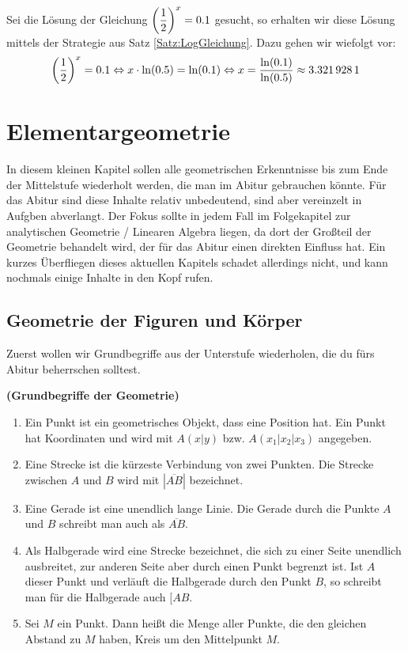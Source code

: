 \documentclass[ngerman, 12pt]{nssheetxea}
\begin{document}
\begin{example}
Sei die Lösung der Gleichung $\mleft(\dfrac{1}{2}\mright)^x = \num{0,1}$ gesucht, so erhalten wir diese Lösung mittels der Strategie aus Satz \ref{Satz:LogGleichung}. Dazu gehen wir wiefolgt vor:
\[ \mleft(\dfrac{1}{2}\mright)^x = \num{0,1} \Leftrightarrow x \cdot \ln (\num{0,5}) = \ln(\num{0,1}) \Leftrightarrow x = \dfrac{\ln(\num{0,1})}{\ln (\num{0,5})} \approx \num{3,3219281} \]
\end{example}

\newpage
\section{Elementargeometrie}
In diesem kleinen Kapitel sollen alle geometrischen Erkenntnisse bis zum Ende der Mittelstufe wiederholt werden, die man im Abitur gebrauchen könnte. Für das Abitur sind diese Inhalte relativ unbedeutend, sind aber vereinzelt in Aufgben abverlangt. Der Fokus sollte in jedem Fall im Folgekapitel zur analytischen Geometrie / Linearen Algebra liegen, da dort der Großteil der Geometrie behandelt wird, der für das Abitur einen direkten Einfluss hat. Ein kurzes Überfliegen dieses aktuellen Kapitels schadet allerdings nicht, und kann nochmals einige Inhalte in den Kopf rufen.

\subsection{Geometrie der Figuren und Körper}

Zuerst wollen wir Grundbegriffe aus der Unterstufe wiederholen, die du fürs Abitur beherrschen solltest.

\begin{definition} \textbf{(Grundbegriffe der Geometrie)}
\begin{enumerate}
\item Ein Punkt ist ein geometrisches Objekt, dass eine Position hat. Ein Punkt hat Koordinaten und wird mit $A(x|y)$ bzw. $A(x_1|x_2|x_3)$ angegeben.
\item Eine Strecke ist die kürzeste Verbindung von zwei Punkten. Die Strecke zwischen $A$ und $B$ wird mit $|\overline{AB}|$ bezeichnet.
\item Eine Gerade ist eine unendlich lange Linie. Die Gerade durch die Punkte $A$ und $B$ schreibt man auch als $\overline{AB}$.
\item Als Halbgerade wird eine Strecke bezeichnet, die sich zu einer Seite unendlich ausbreitet, zur anderen Seite aber durch einen Punkt begrenzt ist. Ist $A$ dieser Punkt und verläuft die Halbgerade durch den Punkt $B$, so schreibt man für die Halbgerade auch $[AB$.
\item Sei $M$ ein Punkt. Dann heißt die Menge aller Punkte, die den gleichen Abstand zu $M$ haben, Kreis um den Mittelpunkt $M$.
\end{enumerate}
\label{Def:Euklid_Objekte}
\end{definition}
\end{document}
